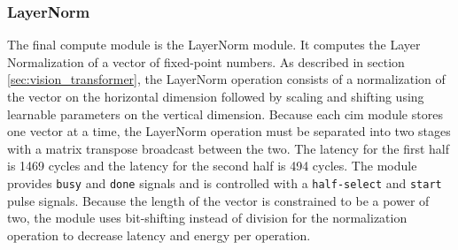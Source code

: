 \subsubsection{LayerNorm}
The final compute module is the LayerNorm module. It computes the Layer Normalization of a vector of fixed-point numbers. As described in section \ref{sec:vision_transformer}, the LayerNorm operation consists of a normalization of
the vector on the horizontal dimension followed by scaling and shifting using learnable parameters on the vertical dimension. Because each \ac{cim} module stores one vector at a time, the LayerNorm operation must be separated into
two stages with a matrix transpose broadcast between the two. The latency for the first half is 1469 cycles and the latency for the second half is 494 cycles. The module provides \texttt{busy} and \texttt{done} signals and is controlled
with a \texttt{half-select} and \texttt{start} pulse signals. Because the length of the vector is constrained to be a power of two, the module uses bit-shifting instead of division for the normalization operation to decrease latency and energy
per operation.

